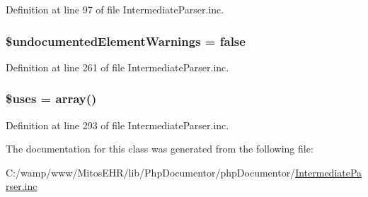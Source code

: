 \-Definition at line 97 of file \-Intermediate\-Parser.\-inc.

\hypertarget{classphp_documentor___intermediate_parser_aea3ee0e6b53ba278d457d0d8aafa952a}{
\subsubsection[{\$undocumented\-Element\-Warnings}]{\setlength{\rightskip}{0pt plus 5cm}\$undocumented\-Element\-Warnings = false}}\label{classphp_documentor___intermediate_parser_aea3ee0e6b53ba278d457d0d8aafa952a}


\-Definition at line 261 of file \-Intermediate\-Parser.\-inc.

\hypertarget{classphp_documentor___intermediate_parser_af050f1d6cfed92e5511909eba5754516}{
\subsubsection[{\$uses}]{\setlength{\rightskip}{0pt plus 5cm}\$uses = array()}}\label{classphp_documentor___intermediate_parser_af050f1d6cfed92e5511909eba5754516}


\-Definition at line 293 of file \-Intermediate\-Parser.\-inc.



\-The documentation for this class was generated from the following file\-:\begin{DoxyCompactItemize}
\item 
\-C\-:/wamp/www/\-Mitos\-E\-H\-R/lib/\-Php\-Documentor/php\-Documentor/\hyperlink{_intermediate_parser_8inc}{\-Intermediate\-Parser.\-inc}\end{DoxyCompactItemize}
